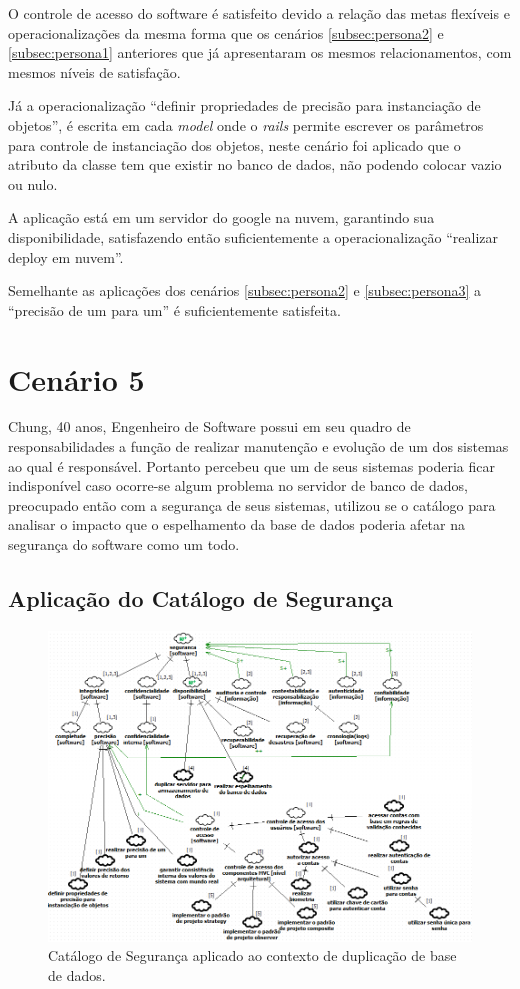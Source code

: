 O controle de acesso do software é satisfeito devido a relação das metas flexíveis e operacionalizações da mesma forma que os cenários \ref{subsec:persona2} e \ref{subsec:persona1} anteriores que já apresentaram os mesmos relacionamentos, com mesmos níveis de satisfação.  

Já a operacionalização “definir propriedades de precisão para instanciação de objetos”, é escrita em cada \textit{model} onde o \textit{rails} permite escrever os parâmetros para controle de instanciação dos objetos, neste cenário foi aplicado que o atributo da classe tem que existir no banco de dados, não podendo colocar vazio ou nulo. 

A aplicação está em um servidor do google na nuvem, garantindo sua disponibilidade, satisfazendo então suficientemente a operacionalização “realizar deploy em nuvem”. 

Semelhante as aplicações dos cenários \ref{subsec:persona2} e \ref{subsec:persona3} a “precisão de um para um” é suficientemente satisfeita. 

\section{Cenário 5}
\label{subsec:persona5}

Chung, 40 anos, Engenheiro de Software possui em seu quadro de responsabilidades a função de realizar manutenção e evolução de um dos sistemas ao qual é responsável. Portanto percebeu que um de seus sistemas poderia ficar indisponível caso ocorre-se algum problema no servidor de banco de dados, preocupado então com a segurança de seus sistemas, utilizou se o catálogo para analisar o impacto que o espelhamento da base de dados poderia afetar na segurança do software como um todo. 

\subsection{Aplicação do Catálogo de Segurança}

\begin{figure}[h!]
	\centering
	\includegraphics[keepaspectratio=true,scale=0.7]{figuras/catalogoPersona5.PNG}
	\caption{Catálogo de Segurança aplicado ao contexto de duplicação de base de dados.}
	\label{catalogoPersona5}
\end{figure}

